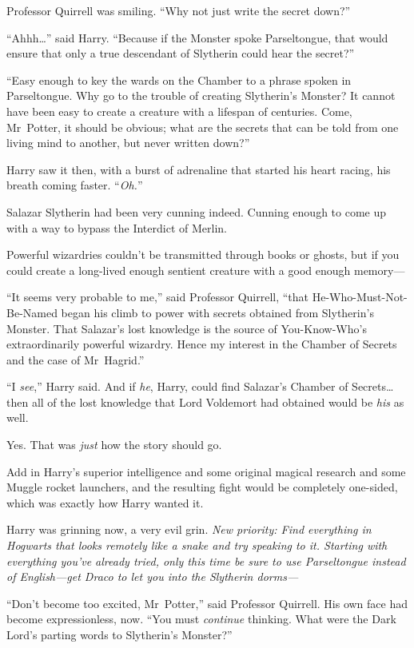 Professor Quirrell was smiling. “Why not just write the secret down?”

“Ahhh…” said Harry. “Because if the Monster spoke Parseltongue, that would ensure that only a true descendant of Slytherin could hear the secret?”

“Easy enough to key the wards on the Chamber to a phrase spoken in Parseltongue. Why go to the trouble of creating Slytherin’s Monster? It cannot have been easy to create a creature with a lifespan of centuries. Come, Mr~Potter, it should be obvious; what are the secrets that can be told from one living mind to another, but never written down?”

Harry saw it then, with a burst of adrenaline that started his heart racing, his breath coming faster. “\emph{Oh.}”

Salazar Slytherin had been very cunning indeed. Cunning enough to come up with a way to bypass the Interdict of Merlin.

Powerful wizardries couldn’t be transmitted through books or ghosts, but if you could create a long-lived enough sentient creature with a good enough memory—

“It seems very probable to me,” said Professor Quirrell, “that He-Who-Must-Not-Be-Named began his climb to power with secrets obtained from Slytherin’s Monster. That Salazar’s lost knowledge is the source of You-Know-Who’s extraordinarily powerful wizardry. Hence my interest in the Chamber of Secrets and the case of Mr~Hagrid.”

“I \emph{see},” Harry said. And if \emph{he}, Harry, could find Salazar’s Chamber of Secrets…then all of the lost knowledge that Lord Voldemort had obtained would be \emph{his} as well.

Yes. That was \emph{just} how the story should go.

Add in Harry’s superior intelligence and some original magical research and some Muggle rocket launchers, and the resulting fight would be completely one-sided, which was exactly how Harry wanted it.

Harry was grinning now, a very evil grin. \emph{New priority: Find everything in Hogwarts that looks remotely like a snake and try speaking to it. Starting with everything you’ve already tried, only this time be sure to use Parseltongue instead of English—get Draco to let you into the Slytherin dorms—}

“Don’t become too excited, Mr~Potter,” said Professor Quirrell. His own face had become expressionless, now. “You must \emph{continue} thinking. What were the Dark Lord’s parting words to Slytherin’s Monster?”

